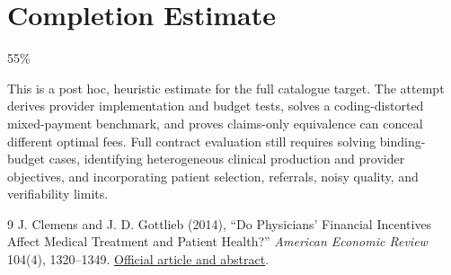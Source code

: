 \documentclass[11pt]{article}
\theoremstyle{definition}
\begin{document}
\section{Completion Estimate}
55\%

This is a post hoc, heuristic estimate for the full catalogue target.
The attempt derives provider implementation and budget tests, solves a coding-distorted mixed-payment benchmark, and proves claims-only equivalence can conceal different optimal fees. Full contract evaluation still requires solving binding-budget cases, identifying heterogeneous clinical production and provider objectives, and incorporating patient selection, referrals, noisy quality, and verifiability limits.

\begin{thebibliography}{9}
 J. Clemens and J. D. Gottlieb (2014), ``Do Physicians' Financial Incentives Affect Medical Treatment and Patient Health?'' \emph{American Economic Review} 104(4), 1320--1349. \href{https://www.aeaweb.org/articles?id=10.1257/aer.104.4.1320}{Official article and abstract}.
\end{thebibliography}
\end{document}
